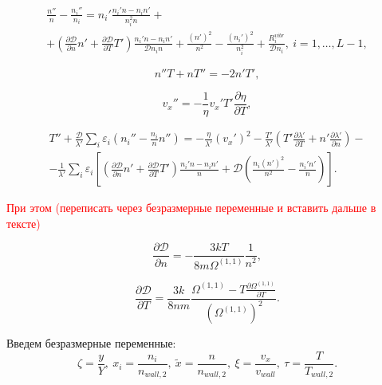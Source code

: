 \documentclass[12pt]{article}
\begin{document}
\begin{multline}
\frac{n''}{n} - \frac{n_{i}''}{n_{i}} = 
  n_{i}' \frac{n_{i}'n - n_{i}n'}{n_{i}^2 n} + \\
  + \left(\frac{\partial \mathcal{D}}{\partial n}n' + \frac{\partial \mathcal{D}}{\partial T}T' \right) \frac{n_{i}'n - n_{i}n'}{\mathcal{D}n_{i}n} + \frac{\left(n'\right)^2}{n^2} - \frac{\left(n_{i}'\right)^2}{n_{i}^2} + \frac{R_{i}^{vibr}}{\mathcal{D}n_{i}},\:i=1,\ldots,L-1,\label{ni-sts-final}
\end{multline}

\begin{equation}
  n''T + nT'' = -2n'T',
\end{equation}

\begin{equation}
  v_{x}'' = -\frac{1}{\eta} v_{x}' T' \frac{\partial \eta}{\partial T},
\end{equation}

\begin{multline}
  T'' + \frac{\mathcal{D}}{\lambda'}\sum_{i}\varepsilon_{i}\left(n_{i}'' - \frac{n_{i}}{n}n'' \right) = -\frac{\eta}{\lambda'} \left(v_{x}' \right)^2 - \frac{T'}{\lambda'} \left(T' \frac{\partial \lambda'}{\partial T} + n' \frac{\partial \lambda'}{\partial n} \right) - \\
  - \frac{1}{\lambda'}\sum_{i}\varepsilon_{i} \left[\left(\frac{\partial \mathcal{D}}{\partial n}n' + \frac{\partial \mathcal{D}}{\partial T}T' \right) \frac{n_{i}'n - n_{i}n'}{n} + \mathcal{D}\left(\frac{n_{i}\left(n'\right)^2}{n^2} - \frac{n_{i}'n'}{n} \right)  \right].\label{T-sts-final}
\end{multline}

\textcolor{red}{При этом (переписать через безразмерные переменные и вставить дальше в тексте)}

\begin{equation}
  \frac{\partial \mathcal{D}}{\partial n} = -\frac{3kT}{8m\Omega^{(1,1)}} \frac{1}{n^2},
\end{equation}

\begin{equation}
  \frac{\partial \mathcal{D}}{\partial T} = \frac{3k}{8nm} \frac{\Omega^{(1,1)} - T \frac{\partial \Omega^{(1,1)}}{\partial T}}{\left(\Omega^{(1,1)}\right)^2}.
\end{equation}

Введем безразмерные переменные:
\begin{equation}
  \zeta = \frac{y}{Y},\:x_{i} = \frac{n_{i}}{n_{wall,2}},\:\tilde{x}=\frac{n}{n_{wall,2}},\:\xi=\frac{v_{x}}{v_{wall}},\:\tau=\frac{T}{T_{wall,2}}.
\end{equation}
\end{document}

